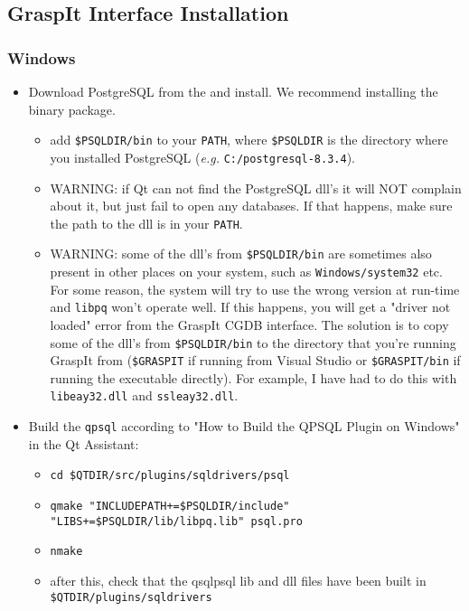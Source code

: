\subsection{GraspIt Interface Installation}
\label{sec:cgdbinterface}
\subsubsection{Windows}
\begin{itemize}
\item Download PostgreSQL from the  and install. We recommend
  installing the binary package.
\begin{itemize}
\item add \texttt{\$PSQLDIR/bin} to your \texttt{PATH}, where
  \texttt{\$PSQLDIR} is the directory where you installed PostgreSQL
  (\textit{e.g.} \texttt{C:/postgresql-8.3.4}).
\item WARNING: if Qt can not find the PostgreSQL dll's it will NOT
  complain about it, but just fail to open any databases. If that
  happens, make sure the path to the dll is in your \texttt{PATH}.
\item WARNING: some of the dll's from \texttt{\$PSQLDIR/bin} are
  sometimes also present in other places on your system, such as
  \texttt{Windows/system32} etc. For some reason, the system will try
  to use the wrong version at run-time and \texttt{libpq} won't
  operate well. If this happens, you will get a "driver not loaded"
  error from the GraspIt CGDB interface. The solution is to copy some
  of the dll's from \texttt{\$PSQLDIR/bin} to the directory that
  you're running GraspIt from (\texttt{\$GRASPIT} if running from
  Visual Studio or \texttt{\$GRASPIT/bin} if running the executable
  directly). For example, I have had to do this with
  \texttt{libeay32.dll} and \texttt{ssleay32.dll}.
\end{itemize}
\item Build the \texttt{qpsql} according to "How to Build the QPSQL
  Plugin on Windows" in the Qt Assistant:
\begin{itemize}
\item \texttt{cd \$QTDIR/src/plugins/sqldrivers/psql}
\item \texttt{qmake "INCLUDEPATH+=\$PSQLDIR/include"
  "LIBS+=\$PSQLDIR/lib/libpq.lib" psql.pro}
\item \texttt{nmake}
\item after this, check that the qsqlpsql lib and dll files have been
  built in \texttt{\$QTDIR/plugins/sqldrivers}

\end{itemize}
\end{itemize}
